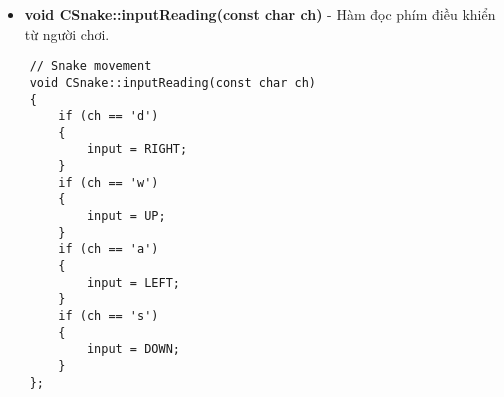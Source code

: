 \documentclass[a4paper, 12pt]{article}
\begin{document}
\begin{center}
    \begin{itemize}
        \item \textbf{void CSnake::inputReading(const char ch)} - Hàm đọc phím điều khiển từ người chơi.
    \end{itemize}
    
    \begin{lstlisting}
    // Snake movement
    void CSnake::inputReading(const char ch)
    {
        if (ch == 'd')
        {
            input = RIGHT;
        }
        if (ch == 'w')
        {
            input = UP;
        }
        if (ch == 'a')
        {
            input = LEFT;
        }
        if (ch == 's')
        {
            input = DOWN;
        }
    };
    \end{lstlisting}
\end{center}
\end{document}

